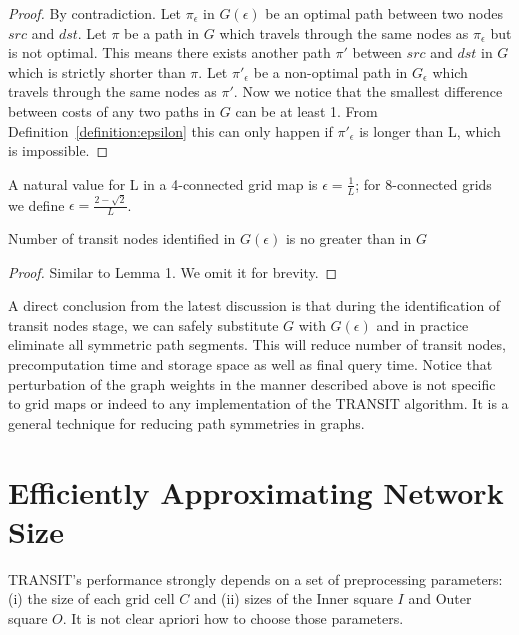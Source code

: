 \begin{proof}
By contradiction. Let $\pi_{\epsilon}$ in $G(\epsilon)$ be an optimal path between two nodes $src$ and $dst$.
Let $\pi$ be a path in $G$ which travels through the same nodes as $\pi_{\epsilon}$ but is not optimal.
This means there exists another path $\pi'$ between $src$ and $dst$ in $G$ which is strictly shorter than $\pi$.
Let $\pi'_{\epsilon}$ be a non-optimal path in $G_{\epsilon}$  which travels through the same nodes as $\pi'$.
Now we notice that the smallest difference between costs of any two paths in $G$ can be at least 1.
From Definition~\ref{definition:epsilon} this can only happen if $\pi'_{\epsilon}$ is longer than L, which is impossible.
\end{proof}

A natural value for L in a 4-connected grid map is $\epsilon = \frac{1}{L}$; 
for 8-connected grids we define $\epsilon = \frac{2-\sqrt{2}}{L}$.

\begin{corollary}
Number of transit nodes identified in $G(\epsilon)$ is no greater than in $G$
\end{corollary}
\begin{proof}
Similar to Lemma 1. We omit it for brevity.
\end{proof}

A direct conclusion from the latest discussion is that during the identification of transit nodes stage,
we can safely substitute $G$ with $G(\epsilon)$ and in practice 
eliminate all symmetric path segments. This will
reduce number of transit nodes, precomputation time and storage space as well as final query time.
Notice that perturbation of the graph weights in the manner described above is not specific to grid maps or
indeed to any implementation of the TRANSIT algorithm. It is a general technique for reducing
path symmetries in graphs.

\section{Efficiently Approximating Network Size}
TRANSIT's performance strongly depends on a set of preprocessing
parameters: (i) the size of each grid cell $C$ and (ii) sizes of the Inner square $I$ and Outer square $O$.
It is not clear apriori how to choose those parameters.


